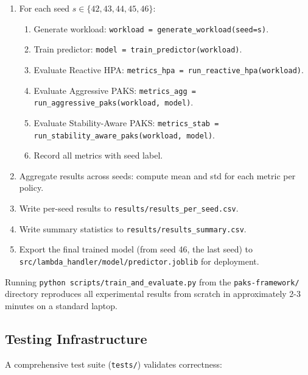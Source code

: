 \begin{enumerate}
  \item For each seed $s \in \{42, 43, 44, 45, 46\}$:
  \begin{enumerate}
    \item Generate workload: \texttt{workload = generate\_workload(seed=s)}.
    \item Train predictor: \texttt{model = train\_predictor(workload)}.
    \item Evaluate Reactive HPA: \texttt{metrics\_hpa = run\_reactive\_hpa(workload)}.
    \item Evaluate Aggressive PAKS: \texttt{metrics\_agg = run\_aggressive\_paks(workload, model)}.
    \item Evaluate Stability-Aware PAKS: \texttt{metrics\_stab = run\_stability\_aware\_paks(workload, model)}.
    \item Record all metrics with seed label.
  \end{enumerate}
  \item Aggregate results across seeds: compute mean and std for each metric per policy.
  \item Write per-seed results to \texttt{results/results\_per\_seed.csv}.
  \item Write summary statistics to \texttt{results/results\_summary.csv}.
  \item Export the final trained model (from seed 46, the last seed) to \texttt{src/lambda\_handler/model/predictor.joblib} for deployment.
\end{enumerate}

Running \texttt{python scripts/train\_and\_evaluate.py} from the \texttt{paks-framework/} directory reproduces all experimental results from scratch in approximately 2-3 minutes on a standard laptop.

\subsection{Testing Infrastructure}

A comprehensive test suite (\texttt{tests/}) validates correctness:


